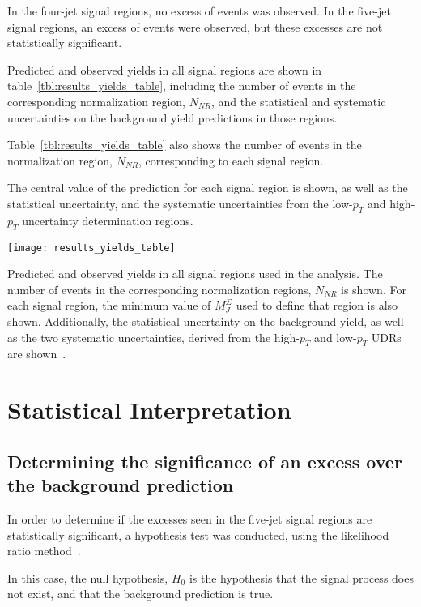 In the four-jet signal regions, no excess of events was observed.
In the five-jet signal regions, an excess of events were observed, but these excesses are not statistically
significant.

Predicted and observed yields in all signal regions are shown in table~\ref{tbl:results_yields_table},
including the number of events in the corresponding normalization region, $N_{NR}$, and the statistical and systematic
uncertainties on the background yield predictions in those regions.

Table~\ref{tbl:results_yields_table} also shows the number of events in the normalization region, $N_{NR}$,
corresponding to each signal region.

The central value of the prediction for each signal region is shown, as well as the statistical uncertainty,
and the systematic uncertainties from the low-$p_T$ and high-$p_T$ uncertainty determination regions.

\begin{table}[!ht]
    \centering
\texttt{[image: results\_yields\_table]}
\caption{Predicted and observed yields in all signal regions used in the analysis.
The number of events in the corresponding normalization regions, $N_{NR}$ is shown.
For each signal region, the minimum value of $M_J^{\Sigma}$ used to define that region is also shown.
Additionally, the statistical uncertainty on the background yield, as well as the two systematic uncertainties,
derived from the high-$p_T$ and low-$p_T$ UDRs are shown~\cite{paper-plb}.}
\label{tbl:results_yields_table}
\end{table}

\section{Statistical Interpretation}\label{sec:results_stats}

\subsection{Determining the significance of an excess over the background prediction}\label{subsec:results_stats_excess}
In order to determine if the excesses seen in the five-jet signal regions are statistically significant,
a hypothesis test was conducted, using the likelihood ratio method~\cite{results-stats-asymptotic}.

In this case, the null hypothesis, $H_0$ is the hypothesis that the signal process does not exist, and that the
background prediction is true.

